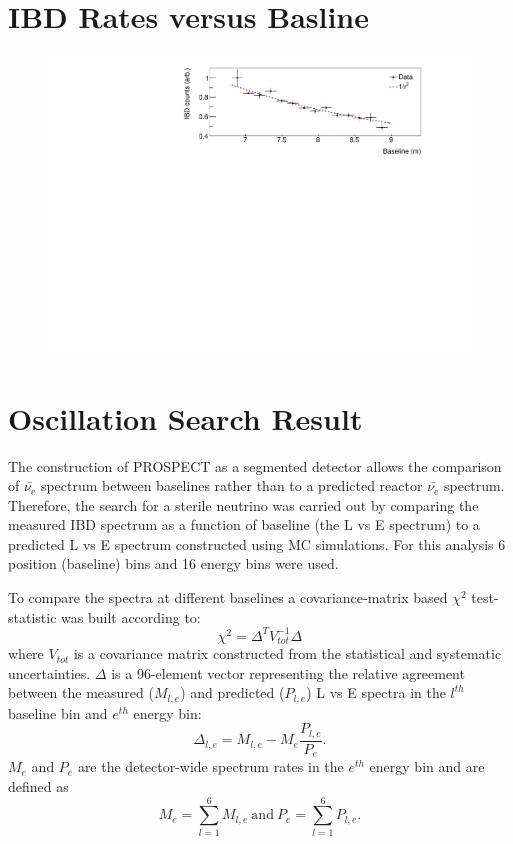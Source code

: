 \section{IBD Rates versus Basline}


\begin{figure}[H]
	\centering
	\includegraphics[width=1\linewidth]{tex/7-oscillation-images/IBDvsBaseline}
	\caption{}
	\label{fig:ibdvsbaseline}
\end{figure}



\section{Oscillation Search Result}

The construction of PROSPECT as a segmented detector allows the comparison of $\bar{\nu_e}$ spectrum between baselines rather than to a predicted reactor $\bar{\nu_e}$ spectrum. 
Therefore, the search for a sterile neutrino was carried out by comparing the measured IBD spectrum as a function of baseline (the L vs E spectrum) to a predicted L vs E spectrum constructed using MC simulations. For this analysis 6 position (baseline) bins and 16 energy bins were used.

To compare the spectra at different baselines a covariance-matrix based $\chi^2$ test-statistic was built according to:
\begin{equation}	
	\chi^2 = \Delta^TV^{-1}_{tot}\Delta
\end{equation}
where $V_{tot}$ is a covariance matrix constructed from the statistical and systematic uncertainties.
$\Delta$ is a 96-element vector representing the relative agreement between the measured ($M_{l,e}$) and predicted ($P_{l,e}$) L vs E spectra in the $l^{th}$ baseline bin and $e^{th}$ energy bin:
\begin{equation}
	\Delta_{l,e} = M_{l,e} - M_e\frac{P_{l,e}}{P_e}.
\end{equation}
$M_e$ and $P_e$ are the detector-wide spectrum rates in the $e^{th}$ energy bin and are defined as
\begin{equation}
	M_e = \sum_{l=1}^{6}M_{l,e}~\textrm{and}~P_e = \sum_{l=1}^{6}P_{l,e}.
\end{equation}




